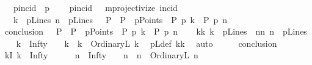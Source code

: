 \begin{isabellebody}
\ \ \ pincid\ {\isacharparenleft}{\kern0pt}\ {\isachardoublequoteopen}p{\isasymlhd}{\isachardoublequoteclose}\ {}{}{\isacharparenright}{\kern0pt}\isanewline
\ \ \ {\isacartoucheopen}pincid\ {\isacharequal}{\kern0pt}\ \ mprojectivize\ {\isacharparenleft}{\kern0pt}incid{\isacharparenright}{\kern0pt}{\isacartoucheclose}\isanewline
\ \ \ {\isachardoublequoteopen}{\isasymlbrakk}k\ {\isasymin}\ pLines{\isacharsemicolon}{\kern0pt}\ n\ {\isasymin}\ pLines{\isasymrbrakk}\ {\isasymLongrightarrow}\ {\isasymexists}\ P\ {\isachardot}{\kern0pt}\ {\isacharparenleft}{\kern0pt}P\ {\isasymin}\ pPoints\ {\isasymand}\ P\ p{\isasymlhd}\ k\ {\isasymand}\ P\ p{\isasymlhd}\ n{\isacharparenright}{\kern0pt}{\isachardoublequoteclose}\isanewline
%
\isadelimproof
\isanewline
%
\endisadelimproof
%
\isatagproof
{}\isamarkupfalse%
\ {\isacharminus}{\kern0pt}\isanewline
\ \ \isamarkupfalse%
\ {\isacharquery}{\kern0pt}conclusion\ {\isacharequal}{\kern0pt}\ {\isachardoublequoteopen}{\isasymexists}\ P\ {\isachardot}{\kern0pt}\ {\isacharparenleft}{\kern0pt}P\ {\isasymin}\ pPoints\ {\isasymand}\ P\ p{\isasymlhd}\ k\ {\isasymand}\ P\ p{\isasymlhd}\ n{\isacharparenright}{\kern0pt}{\isachardoublequoteclose}\isanewline
\ \ \isamarkupfalse%
\ kk{\isacharcolon}{\kern0pt}\ {\isachardoublequoteopen}k\ {\isasymin}\ pLines{\isachardoublequoteclose}\ \ nn{\isacharcolon}{\kern0pt}\ {\isachardoublequoteopen}n\ {\isasymin}\ pLines{\isachardoublequoteclose}\isanewline
\ \ \isamarkupfalse%
\ {\isachardoublequoteopen}{\isacharparenleft}{\kern0pt}k\ {\isacharequal}{\kern0pt}\ Infty{\isacharparenright}{\kern0pt}\ {\isacharbar}{\kern0pt}\ \ {\isacharparenleft}{\kern0pt}{\isasymexists}\ k{}\ {\isachardot}{\kern0pt}\ k\ {\isacharequal}{\kern0pt}\ OrdinaryL\ k{}{\isacharparenright}{\kern0pt}{\isachardoublequoteclose}\ \isamarkupfalse%
\ pLdef\ kk\ \isamarkupfalse%
\ auto\isanewline
\ \ \isamarkupfalse%
\ \isamarkupfalse%
\ {\isacharquery}{\kern0pt}conclusion\isanewline
\ \ \isamarkupfalse%
\isanewline
\ \ \ \ \isamarkupfalse%
\ kI{\isacharcolon}{\kern0pt}\ {\isachardoublequoteopen}{\isacharparenleft}{\kern0pt}k\ {\isacharequal}{\kern0pt}\ Infty{\isacharparenright}{\kern0pt}{\isachardoublequoteclose}\isanewline
\ \ \ \ \isamarkupfalse%
\ {\isachardoublequoteopen}{\isacharparenleft}{\kern0pt}n\ {\isacharequal}{\kern0pt}\ Infty{\isacharparenright}{\kern0pt}\ {\isacharbar}{\kern0pt}\ \ {\isacharparenleft}{\kern0pt}{\isasymexists}\ n{}\ {\isachardot}{\kern0pt}\ n\ {\isacharequal}{\kern0pt}\ OrdinaryL\ n{}{\isacharparenright}{\kern0pt}{\isachardoublequoteclose}\ \isamarkupfalse%

\end{isabellebody}
